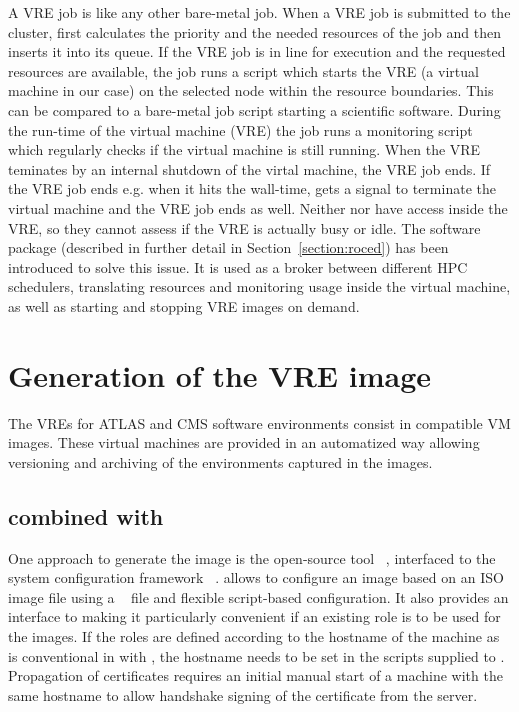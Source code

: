 A VRE job is like any other bare-metal job.
When a VRE job is submitted to the \NEMO cluster, \Moab  first calculates the
priority and the needed resources of the job and then inserts it into its queue.
If the VRE job is in line for execution and the requested resources are available,
the job runs a script which starts the VRE (a virtual machine in our case) on the selected node
within the resource boundaries. This can be compared to a bare-metal job script starting a scientific software.
During the run-time of the virtual machine (VRE) the job runs a monitoring
script which regularly checks if the virtual machine is still running.
When the VRE teminates by an internal shutdown of the virtal machine, the VRE job ends.
If the VRE job ends e.g. when it hits the wall-time, \Openstack gets a signal to terminate the virtual machine and
the VRE job ends as well. Neither \Moab nor \Openstack have access
 inside the VRE, so they cannot assess if the VRE is actually busy or
idle.
The software package \Roced (described in
further detail in Section~\ref{section:roced}) has been introduced to
solve this issue.
It is used as a broker between
different HPC schedulers,  translating resources and monitoring usage inside the
virtual machine, as well as starting and stopping VRE images on demand.

\section{Generation of the VRE image}
The VREs for ATLAS and CMS software environments consist in \Openstack compatible VM images.
These virtual machines are provided in an automatized
way allowing versioning and archiving of the environments captured in
the images.

\subsection{\Packer combined with \Puppet}


One approach to generate the image is the open-source tool
\Packer~\cite{packer}, interfaced to the system configuration framework \Puppet~\cite{puppet}.
\Packer allows to configure an image based on an ISO image file using a \kickstart~\cite{kickstart} file and flexible script-based configuration. 
It also provides an interface to \Puppet making it particularly convenient if an existing \Puppet role is to be used for the images. If the roles are defined according to the hostname of the machine as is conventional in \Puppet with \Hieradata, the hostname needs to be set in the scripts supplied to \Packer. Propagation of certificates requires an initial manual start of a machine with the same hostname to allow handshake signing of the certificate from the \Puppet server.

